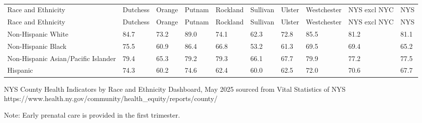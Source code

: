 \documentclass[
  english,
  letterpaper,
]{report}
\begin{document}
\begin{longtable}[]{@{}llllllllll@{}}

\caption{\label{tbl-epc-rande-percent}Percentage of Births with Early
Prenatal Care by Race and Ethnicity, 2020--2022}

\tabularnewline

\caption{}\label{T_48160}\tabularnewline
\toprule\noalign{}
Race and Ethnicity & Dutchess & Orange & Putnam & Rockland & Sullivan &
Ulster & Westchester & NYS excl NYC & NYS \\
\midrule\noalign{}
\endfirsthead
\toprule\noalign{}
Race and Ethnicity & Dutchess & Orange & Putnam & Rockland & Sullivan &
Ulster & Westchester & NYS excl NYC & NYS \\
\midrule\noalign{}
\endhead
\bottomrule\noalign{}
\endlastfoot
Non-Hispanic White & 84.7 & 73.2 & 89.0 & 74.1 & 62.3 & 72.8 & 85.5 &
81.2 & 81.1 \\
Non-Hispanic Black & 75.5 & 60.9 & 86.4 & 66.8 & 53.2 & 61.3 & 69.5 &
69.4 & 65.2 \\
Non-Hispanic Asian/Pacific Islander & 79.4 & 65.3 & 79.2 & 79.3 & 66.1 &
67.7 & 79.9 & 77.2 & 77.5 \\
Hispanic & 74.3 & 60.2 & 74.6 & 62.4 & 60.0 & 62.5 & 72.0 & 70.6 &
67.7 \\

\end{longtable}

\begin{tcolorbox}[enhanced jigsaw, breakable, leftrule=.75mm, title=\textcolor{quarto-callout-note-color}{\faInfo}\hspace{0.5em}{Source}, bottomrule=.15mm, opacityback=0, left=2mm, colback=white, bottomtitle=1mm, coltitle=black, colbacktitle=quarto-callout-note-color!10!white, colframe=quarto-callout-note-color-frame, opacitybacktitle=0.6, toptitle=1mm, titlerule=0mm, arc=.35mm, rightrule=.15mm, toprule=.15mm]

NYS County Health Indicators by Race and Ethnicity Dashboard, May 2025
sourced from Vital Statistics of NYS
https://www.health.ny.gov/community/health\_equity/reports/county/

\end{tcolorbox}

\begin{tcolorbox}[enhanced jigsaw, breakable, leftrule=.75mm, title=\textcolor{quarto-callout-note-color}{\faInfo}\hspace{0.5em}{Note}, bottomrule=.15mm, opacityback=0, left=2mm, colback=white, bottomtitle=1mm, coltitle=black, colbacktitle=quarto-callout-note-color!10!white, colframe=quarto-callout-note-color-frame, opacitybacktitle=0.6, toptitle=1mm, titlerule=0mm, arc=.35mm, rightrule=.15mm, toprule=.15mm]

Note: Early prenatal care is provided in the first trimester.

\end{tcolorbox}
\end{document}
